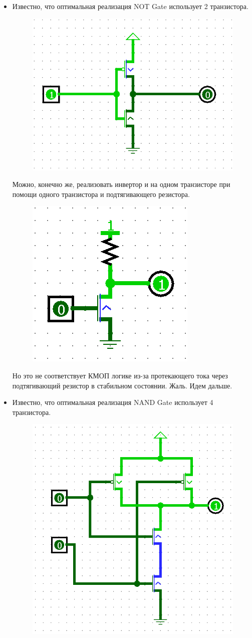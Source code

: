 \begin{itemize}
\item Известно, что оптимальная реализация NOT Gate использует 2 транзистора.
\begin{figure}[H]
    \centering
    \includegraphics[width=0.5\linewidth]{Gates/NOT.png}
\end{figure}
Можно, конечно же, реализовать инвертор и на одном транзисторе при помощи одного транзистора и подтягивающего резистора.
\begin{figure}[H]
    \centering
    \includegraphics[width=0.25\linewidth]{Contrexamples/NOT Gate.png}
\end{figure}
Но это не соответствует КМОП логике из-за протекающего тока через подтягивающий резистор в стабильном состоянии. Жаль. Идем дальше.\\
\item Известно, что оптимальная реализация NAND Gate использует 4 транзистора.
\begin{figure}[H]
    \centering
    \includegraphics[width=0.5\linewidth]{Gates/NAND.png}

\end{figure}
\end{itemize}

